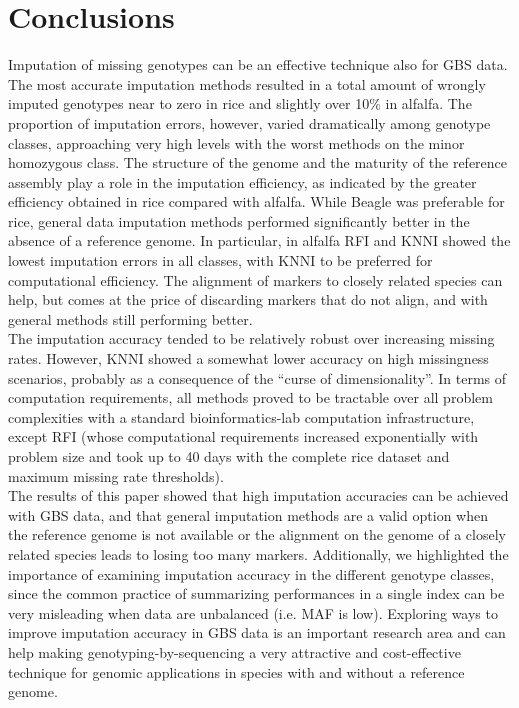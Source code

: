 \section{Conclusions}
\label{sec:conclusions}
Imputation of missing genotypes can be an effective technique also for GBS data.
The most accurate imputation methods resulted in a total amount of wrongly imputed genotypes near to zero in rice and slightly over 10\% in alfalfa. 
The proportion of imputation errors, however, varied dramatically among genotype classes, approaching very high levels with the worst methods on the minor homozygous class.
The structure of the genome and the maturity of the reference assembly play a role in the imputation efficiency, as indicated by the greater efficiency obtained in rice compared with alfalfa. While Beagle was preferable for rice, general data imputation methods performed significantly better in the absence of a reference genome. In particular, in alfalfa RFI and KNNI showed the lowest imputation errors in all classes, with KNNI to be preferred for computational efficiency. The alignment of markers to closely related species can help, but comes at the price of discarding markers that do not align, and with general methods still performing better.\\
The imputation accuracy tended to be relatively robust over increasing missing rates. However, KNNI showed a somewhat lower accuracy on high missingness scenarios, probably as a consequence of the ``curse of dimensionality''. In terms of computation requirements, all methods proved to be tractable over all problem complexities with a standard bioinformatics-lab computation infrastructure, except RFI (whose computational requirements increased exponentially with problem size and took up to 40 days with the complete rice dataset and maximum missing rate thresholds).\\


The results of this paper showed that high imputation accuracies can be achieved with GBS data, and that general imputation methods are a valid option when the reference genome is not available or the alignment on the genome of a closely related species leads to losing too many markers. Additionally, we highlighted the importance of examining imputation accuracy in the different genotype classes, since the common practice of summarizing performances in a single index can be very misleading when data are unbalanced (i.e. MAF is low).
Exploring ways to improve imputation accuracy in GBS data is an important research area and can help making genotyping-by-sequencing a very attractive and cost-effective technique for genomic applications in species with and without a reference genome.




